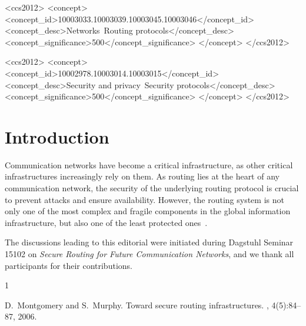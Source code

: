 \documentclass[sigconf]{acmart}
\begin{document}
\begin{CCSXML}
	<ccs2012>
	<concept>
	<concept_id>10003033.10003039.10003045.10003046</concept_id>
	<concept_desc>Networks~Routing protocols</concept_desc>
	<concept_significance>500</concept_significance>
	</concept>
	</ccs2012>
\end{CCSXML}

\begin{CCSXML}
	<ccs2012>
	<concept>
	<concept_id>10002978.10003014.10003015</concept_id>
	<concept_desc>Security and privacy~Security protocols</concept_desc>
	<concept_significance>500</concept_significance>
	</concept>
	</ccs2012>
\end{CCSXML}



\maketitle

\section{Introduction}\label{sec:intro}

Communication networks have become a critical infrastructure, as other critical
infrastructures increasingly rely on them.
As routing lies at the heart of
any communication network,
the security of the underlying
routing protocol is crucial
to prevent attacks and ensure availability.
However, the routing system is not only one
of the most complex and fragile components in the
global information infrastructure, but also
one of the least protected ones~\cite{route-infra}.

\begin{acks}
	The discussions leading to this editorial were initiated during
	Dagstuhl Seminar 15102 on
	\emph{Secure Routing for Future Communication Networks},
	and we thank all participants for their contributions.
\end{acks}

{ \balance
{
	\begin{thebibliography}{1}

		D.~Montgomery and S.~Murphy.
		\newblock Toward secure routing infrastructures.
		, 4(5):84--87, 2006.

	\end{thebibliography}
}
}
\end{document}
